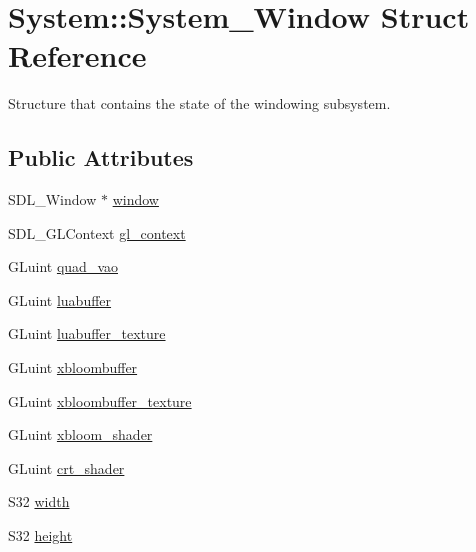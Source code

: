 \hypertarget{structSystem_1_1System__Window}{}\section{System\+::System\+\_\+\+Window Struct Reference}
\label{structSystem_1_1System__Window}


Structure that contains the state of the windowing subsystem.  


\subsection*{Public Attributes}
\begin{DoxyCompactItemize}
\item 
S\+D\+L\+\_\+\+Window $\ast$ \mbox{\hyperlink{structSystem_1_1System__Window_a76d0075f1fa69135e184f9a6d24d4576}{window}}
\item 
S\+D\+L\+\_\+\+G\+L\+Context \mbox{\hyperlink{structSystem_1_1System__Window_a4c7a2e74ca760738cf797ada527e93b0}{gl\+\_\+context}}
\item 
G\+Luint \mbox{\hyperlink{structSystem_1_1System__Window_a389eed5663869ef9186fa3e04cc5760d}{quad\+\_\+vao}}
\item 
G\+Luint \mbox{\hyperlink{structSystem_1_1System__Window_ac9845de36f533a566aa53348abc06b33}{luabuffer}}
\item 
G\+Luint \mbox{\hyperlink{structSystem_1_1System__Window_a1d16659ce8890a3d98f03c3a41f0bb56}{luabuffer\+\_\+texture}}
\item 
G\+Luint \mbox{\hyperlink{structSystem_1_1System__Window_a1b17d691077fc954bdfe68e7a178909f}{xbloombuffer}}
\item 
G\+Luint \mbox{\hyperlink{structSystem_1_1System__Window_a89a403f3e9c28d8595caee8e22a9f958}{xbloombuffer\+\_\+texture}}
\item 
G\+Luint \mbox{\hyperlink{structSystem_1_1System__Window_a83dc699de83660e0a09e80844ded80b2}{xbloom\+\_\+shader}}
\item 
G\+Luint \mbox{\hyperlink{structSystem_1_1System__Window_a66199a381d344b5e4fa30a8096688db5}{crt\+\_\+shader}}
\item 
S32 \mbox{\hyperlink{structSystem_1_1System__Window_afb21eca26e1c840c44975b2c02f30ad5}{width}}
\item 
S32 \mbox{\hyperlink{structSystem_1_1System__Window_a56dd8dbf992cd3454c0f0d29ec839f8e}{height}}
\end{DoxyCompactItemize}


